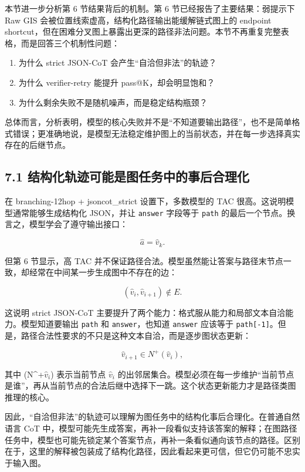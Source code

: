 \documentclass[
  11pt,
]{article}
\begin{document}
本节进一步分析第 6 节结果背后的机制。第 6 节已经报告了主要结果：弱提示下
Raw GIS 会被位置线索虚高，结构化路径输出能缓解链式图上的 endpoint
shortcut，但在困难分叉图上暴露出更深的路径非法问题。本节不再重复完整表格，而是回答三个机制性问题：

\begin{enumerate}
\def\labelenumi{\arabic{enumi}.}
\item
  为什么 strict JSON-CoT 会产生``自洽但非法''的轨迹？
\item
  为什么 verifier-retry 能提升 pass@K，却会明显饱和？
\item
  为什么剩余失败不是随机噪声，而是稳定结构瓶颈？
\end{enumerate}

总体而言，分析表明，模型的核心失败并不是``不知道要输出路径''，也不是简单格式错误；更准确地说，是模型无法稳定维护图上的当前状态，并在每一步选择真实存在的后继节点。

\subsection{7.1
结构化轨迹可能是图任务中的事后合理化}\label{ux7ed3ux6784ux5316ux8f68ux8ff9ux53efux80fdux662fux56feux4efbux52a1ux4e2dux7684ux4e8bux540eux5408ux7406ux5316}

在 branching-12hop + jsoncot\_strict 设置下，多数模型的 TAC
很高。这说明模型通常能够生成结构化 JSON，并让 \texttt{answer} 字段等于
\texttt{path} 的最后一个节点。换言之，模型学会了遵守输出接口：

\[
\hat{a}=\hat{v}_k.  
\]

但第 6 节显示，高 TAC
并不保证路径合法。模型虽然能让答案与路径末节点一致，却经常在中间某一步生成图中不存在的边：

\[
(\hat{v}_i,\hat{v}_{i+1})\notin E.  
\]

这说明 strict JSON-CoT
主要提升了两个能力：格式服从能力和局部文本自洽能力。模型知道要输出
\texttt{path} 和 \texttt{answer}，也知道 \texttt{answer} 应该等于
\texttt{path{[}-1{]}}。但是，路径合法性要求的不只是这种文本自洽，而是逐步图状态更新：

\[
\hat{v}_{i+1}\in N^+(\hat{v}_i),  
\]

其中 (N\^{}+\(\hat{v}_i\)) 表示当前节点 \(\hat{v}_i\)
的出邻居集合。模型必须在每一步维护``当前节点是谁''，再从当前节点的合法后继中选择下一跳。这个状态更新能力才是路径类图推理的核心。

因此，``自洽但非法''的轨迹可以理解为图任务中的结构化事后合理化。在普通自然语言
CoT
中，模型可能先生成答案，再补一段看似支持该答案的解释；在图路径任务中，模型也可能先锁定某个答案节点，再补一条看似通向该节点的路径。区别在于，这里的解释被包装成了结构化路径，因此看起来更可信，但它仍可能不忠实于输入图。
\end{document}
